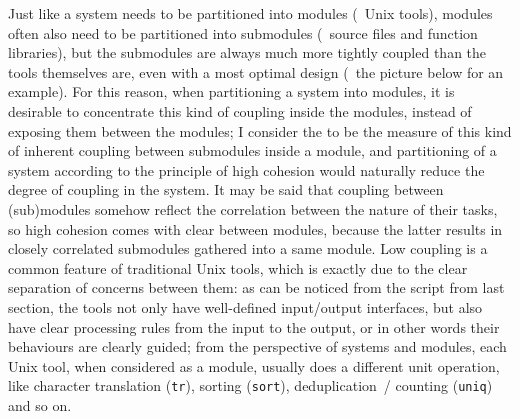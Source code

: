Just like a system needs to be partitioned into modules (\eg~Unix tools),
modules often also need to be partitioned into submodules (\eg~source files
and function libraries), but the submodules are always much more tightly
coupled than the tools themselves are, even with a most optimal design (\cf~the
picture below for an example).  For this reason, when partitioning a system
into modules, it is desirable to concentrate this kind of coupling inside
the modules, instead of exposing them between the modules; I consider the
 to be the measure of this kind of inherent coupling
between submodules inside a module, and partitioning of a system according to
the principle of high cohesion would naturally reduce the degree of coupling in
the system.  It may be said that coupling between (sub)modules somehow reflect
the correlation between the nature of their tasks, so high cohesion comes with
clear  between modules, because the latter
results in closely correlated submodules gathered into a same module.  Low
coupling is a common feature of traditional Unix tools, which is exactly due
to the clear separation of concerns between them: as can be noticed from the
script from last section, the tools not only have well-defined input/output
interfaces, but also have clear processing rules from the input to the output,
or in other words their behaviours are clearly guided; from the perspective
of systems and modules, each Unix tool, when considered as a module, usually
does a different unit operation, like character translation (\verb|tr|),
sorting (\verb|sort|), deduplication~/ counting (\verb|uniq|) and so on.
\begin{wquoting}
\end{wquoting}

